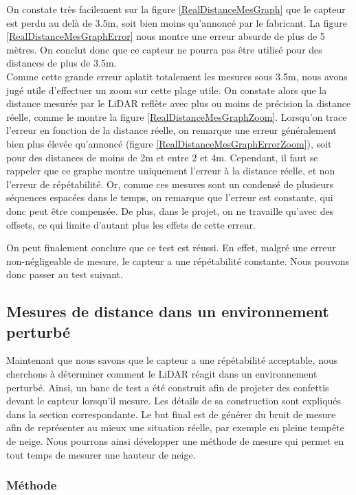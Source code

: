 On constate très facilement sur la figure \ref{RealDistanceMesGraph} que le capteur est perdu au delà
de 3.5m, soit bien moins qu'annoncé par le fabricant. La figure \ref{RealDistanceMesGraphError} nous 
montre une erreur absurde de plus de 5 mètres. On conclut donc que ce capteur ne pourra pas être utilisé
pour des distances de plus de 3.5m.\\
Comme cette grande erreur aplatit totalement les mesures sous 3.5m, nous avons jugé utile d'effectuer un
zoom sur cette plage utile. On constate alors que la distance mesurée par le LiDAR reflète avec plus ou
moins de précision la distance réelle, comme le montre la figure \ref{RealDistanceMesGraphZoom}.
Lorsqu'on trace l'erreur en fonction de la distance réelle, on remarque une erreur généralement bien plus
élevée qu'annoncé (figure \ref{RealDistanceMesGraphErrorZoom}), soit \textpm 1cm pour des distances de 
moins de 2m et \textpm 2cm entre 2 et 4m. Cependant, il faut se rappeler que ce graphe montre uniquement 
l'erreur à la distance réelle, et non l'erreur de répétabilité. Or, comme ces mesures sont un condensé 
de plusieurs séquences espacées dans le temps, on remarque que l'erreur est constante, qui donc peut 
être compensée. De plus, dans le projet, on ne travaille qu'avec des offsets, ce qui limite d'autant 
plus les effets de cette erreur.\par

On peut finalement conclure que ce test est réussi. En effet, malgré une erreur non-négligeable de mesure,
le capteur a une répétabilité constante. Nous pouvons donc passer au test suivant.

\subsection{Mesures de distance dans un environnement perturbé}
\label{MesNoise}

Maintenant que nous savons que le capteur a une répétabilité acceptable, nous cherchons à déterminer comment 
le LiDAR réagit dans un environnement perturbé. Ainsi, un banc de test a été construit afin de projeter 
des confettis devant le capteur lorsqu'il mesure. Les détails de sa construction sont expliqués dans la
section correspondante. Le but final est de générer du bruit de mesure afin de représenter au mieux une
situation réelle, par exemple en pleine tempête de neige. Nous pourrons ainsi développer une méthode
de mesure qui permet en tout temps de mesurer une hauteur de neige.

\subsubsection{Méthode}


